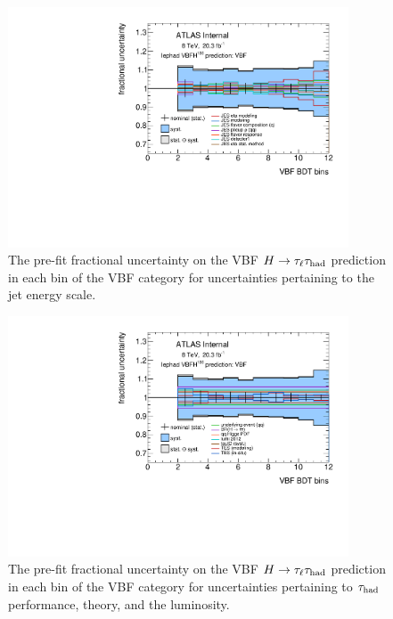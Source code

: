\begin{figure}[tp]
  \includegraphics[width=0.90\textwidth]{figures/uncertainties/uncertainties_lephad_paper14_8TeV_VBFH125_JES_VBF}
  \caption{The pre-fit fractional uncertainty on the VBF $H\rightarrow\tau_\ell\tau_\text{had}$ prediction in each bin of the VBF category for uncertainties pertaining to the jet energy scale.}
  \label{fig:backgrounds-uncertainties-vbfjes}
\end{figure}

\begin{figure}[tp]
  \includegraphics[width=0.90\textwidth]{figures/uncertainties/uncertainties_lephad_paper14_8TeV_VBFH125_other_VBF}
  \caption{The pre-fit fractional uncertainty on the VBF $H\rightarrow\tau_\ell\tau_\text{had}$ prediction in each bin of the VBF category for uncertainties pertaining to $\tau_\text{had}$ performance, theory, and the luminosity.}
  \label{fig:backgrounds-uncertainties-vbfother}
\end{figure}

